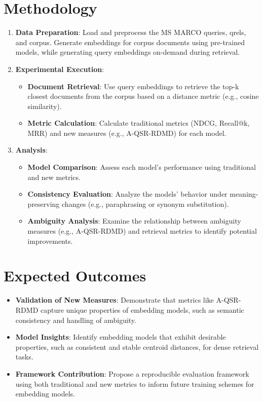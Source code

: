 \documentclass{article}
\begin{document}
\section{Methodology}
\begin{enumerate}
    \item \textbf{Data Preparation}: Load and preprocess the MS MARCO queries, qrels, and corpus. Generate embeddings for corpus documents using pre-trained models, while generating query embeddings on-demand during retrieval.
    
    \item \textbf{Experimental Execution}:
    \begin{itemize}
        \item \textbf{Document Retrieval}: Use query embeddings to retrieve the top-k closest documents from the corpus based on a distance metric (e.g., cosine similarity).
        \item \textbf{Metric Calculation}: Calculate traditional metrics (NDCG, Recall@k, MRR) and new measures (e.g., A-QSR-RDMD) for each model.
    \end{itemize}
    
    \item \textbf{Analysis}:
    \begin{itemize}
        \item \textbf{Model Comparison}: Assess each model's performance using traditional and new metrics.
        \item \textbf{Consistency Evaluation}: Analyze the models' behavior under meaning-preserving changes (e.g., paraphrasing or synonym substitution).
        \item \textbf{Ambiguity Analysis}: Examine the relationship between ambiguity measures (e.g., A-QSR-RDMD) and retrieval metrics to identify potential improvements.
    \end{itemize}
\end{enumerate}

\section{Expected Outcomes}
\begin{itemize}
    \item \textbf{Validation of New Measures}: Demonstrate that metrics like A-QSR-RDMD capture unique properties of embedding models, such as semantic consistency and handling of ambiguity.
    \item \textbf{Model Insights}: Identify embedding models that exhibit desirable properties, such as consistent and stable centroid distances, for dense retrieval tasks.
    \item \textbf{Framework Contribution}: Propose a reproducible evaluation framework using both traditional and new metrics to inform future training schemes for embedding models.
\end{itemize}
\end{document}
